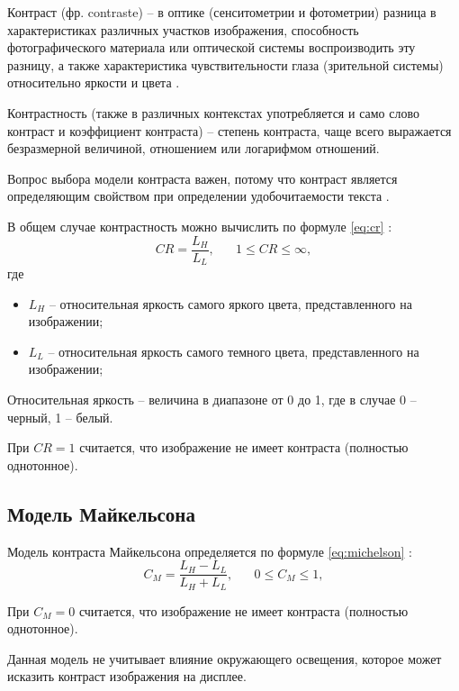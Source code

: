 Контраст (фр. contraste) -- в оптике (сенситометрии и фотометрии) разница в характеристиках различных участков изображения, способность фотографического материала или оптической системы воспроизводить эту разницу, а также характеристика чувствительности глаза (зрительной системы) относительно яркости и цвета \cite{contrast}.

Контрастность (также в различных контекстах употребляется и само слово контраст и коэффициент контраста) -- степень контраста, чаще всего выражается безразмерной величиной, отношением или логарифмом отношений.

Вопрос выбора модели контраста важен, потому что контраст является определяющим свойством при определении удобочитаемости текста \cite{wcag1}.

В общем случае контрастность можно вычислить по формуле \ref{eq:cr} \cite{weber}:
\begin{equation}
	\label{eq:cr}
	CR=\frac{L_H}{L_L}, \text{~~~~~$1 \le CR \le \infty$},
\end{equation}
где
\begin{itemize}
	\item $L_H$ -- относительная яркость \cite{relativeluminance} самого яркого цвета, представленного на изображении;
	\item $L_L$ -- относительная яркость самого темного цвета, представленного на изображении;
\end{itemize}

Относительная яркость -- величина в диапазоне от 0 до 1, где в случае 0 -- черный, 1 -- белый.

При $CR = 1$ считается, что изображение не имеет контраста (полностью однотонное).

\subsection{Модель Майкельсона}

Модель контраста Майкельсона определяется по формуле \ref{eq:michelson} \cite{weber}:
\begin{equation}
	\label{eq:michelson}
	C_M=\frac{L_H-L_L}{L_H+L_L}, \text{~~~~~$0 \le C_M \le 1$},
\end{equation}

При $C_M = 0$ считается, что изображение не имеет контраста (полностью однотонное).

Данная модель не учитывает влияние окружающего освещения, которое может исказить контраст изображения на дисплее.

